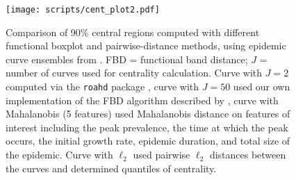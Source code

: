 \documentclass[fleqn,10pt,lineno]{wlpeerj}
\begin{document}
\begin{figure}[ht]\centering
  \texttt{[image: scripts/cent\_plot2.pdf]}
  \caption{Comparison of 90\% central regions computed with
    different functional boxplot and pairwise-distance methods, using epidemic curve ensembles from \juul. FBD = functional band distance; $J$ = number of curves used for centrality calculation. Curve with $J=2$ computed via the \texttt{roahd} package \citep{roahd}, curve with $J=50$ used our own implementation of the FBD algorithm described by \juul, curve with Mahalanobis (5 features) used Mahalanobis distance on features of interest including the peak prevalence, the time at which the peak occurs, the initial growth rate, epidemic duration, and total size of the epidemic. Curve with $\ell_2$ used  pairwise $\ell_2$ distances between the curves and determined quantiles of centrality.
  }
  \label{p.b}
\end{figure}
\end{document}
